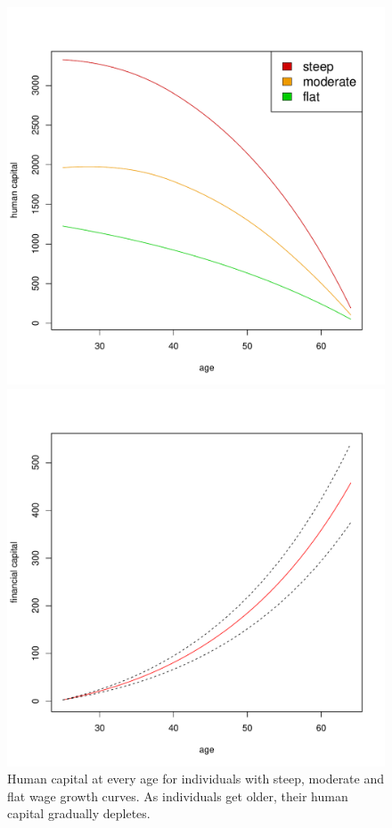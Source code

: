 \begin{figure}[h!]
	\centering
    \begin{minipage}{0.45\textwidth}
		\centering
		\includegraphics[scale=0.4]{figs/humancapital.pdf}
		\caption{Human capital at every age for individuals with steep, moderate and flat wage growth curves. As individuals get older, their human capital gradually depletes.}
		\label{fig:humcap}
	\end{minipage}
	\hfill
    \begin{minipage}{0.45\textwidth}
		\centering
		\includegraphics[scale=0.4]{figs/fincapital.pdf}

\end{minipage}
\end{figure}
